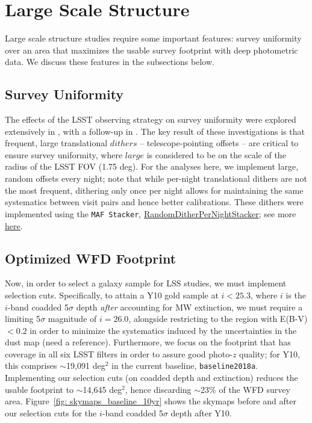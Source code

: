 \newcommand{\ttt}[1]{\texttt{#1}}

\section{Large Scale Structure}
Large scale structure studies require some important features: survey uniformity over an area that maximizes the usable survey footprint with deep photometric data.  We discuss these features in the subsections below.
\subsection{Survey Uniformity}
The effects of the LSST observing strategy on survey uniformity were explored extensively in \citet{Awan+2016}, with a follow-up in \citet[Section 9.2]{Marshall:2017wph}. The key result of these investigations is that frequent, large translational $dithers$ -- telescope-pointing offsets -- are critical to ensure survey uniformity, where $large$ is considered to be on the scale of the radius of the LSST FOV (1.75 deg). For the analyses here, we implement large, random offsets every night; note that while per-night translational dithers are not the most frequent, dithering only once per night allows for maintaining the same systematics between visit pairs and hence better calibrations. These dithers were implemented using the \ttt{MAF Stacker}, \href{https://github.com/lsst/sims_maf/blob/97988f6bc30c216fffb41e6da0a7d201e919b9ca/python/lsst/sims/maf/stackers/ditherStackers.py#L371}{RandomDitherPerNightStacker}; see more \href{https://github.com/LSSTDESC/ObsStrat/tree/issue/3/desc-dithers}{here}.

\subsection{Optimized WFD Footprint}
Now, in order to select a galaxy sample for LSS studies, we must implement selection cuts. Specifically, to attain a Y10 gold sample at $i<25.3$, where $i$ is the $i$-band coadded 5$\sigma$ depth {\em after} accounting for MW extinction, we must require a limiting 5$\sigma$ magnitude of $i=26.0$, alongside restricting to the region with E(B-V) $<0.2$ in order to minimize the systematics induced by the uncertainties in the dust map (need a reference). Furthermore, we focus on the footprint that has coverage in all six LSST filters in order to assure good photo-$z$ quality; for Y10, this comprises $\sim$19,091 deg$^2$ in the current baseline, \ttt{baseline2018a}. Implementing our selection cuts (on coadded depth and extinction) reduces the usable footprint to $\sim$14,645 deg$^2$, hence discarding  $\sim$23\% of the WFD survey area. Figure~\ref{fig: skymaps_baseline_10yr} shows the skymaps before and after our selection cuts for the $i$-band coadded 5$\sigma$ depth after Y10.


